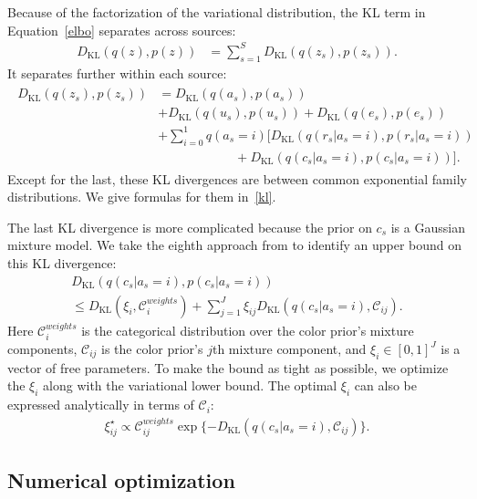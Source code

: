 Because of the factorization of the variational distribution, the KL term in Equation~\ref{elbo} separates across sources:
\begin{align}
D_{\mathrm{KL}}(q(z), p(z)) &= \sum_{s=1}^S D_{\mathrm{KL}}(q(z_s), p(z_s)).\label{eq:kl}
\end{align}
It separates further within each source:
\begin{align}
\begin{split}
D_{\mathrm{KL}}(q(z_s), p(z_s)) &=
D_{\mathrm{KL}}(q(a_s), p(a_s))\\
&+ D_{\mathrm{KL}}(q(u_s), p(u_s))
+ D_{\mathrm{KL}}(q(e_s), p(e_s))\\
&+ \sum_{i=0}^1 q(a_s = i) \Big[
    D_{\mathrm{KL}}(q(r_s | a_s = i), p(r_s | a_s = i))\\
    &\qquad\qquad\qquad + D_{\mathrm{KL}}(q(c_s | a_s = i), p(c_s | a_s = i))
\Big].
\end{split}
\label{kleq}
\end{align}
Except for the last, these KL divergences are between common exponential family distributions. We give formulas for them in~\ref{kl}.

The last KL divergence is more complicated because the prior on $c_s$ is a Gaussian mixture model.
We take the eighth approach from \citet{hershey2007approximating} to identify an upper bound on this KL divergence:
\begin{multline}
D_{\mathrm{KL}}(q(c_s | a_s = i), p(c_s | a_s = i)) \\ \le
D_{\mathrm{KL}}(\xi_i, \mathcal C_{i}^{weights}) + \sum_{j=1}^J \xi_{ij} D_{\mathrm{KL}}(q(c_s | a_s = i), \mathcal C_{ij}).
\end{multline}
Here $\mathcal C_{i}^{weights}$ is the categorical distribution over the color prior's mixture components, $\mathcal C_{ij}$ is the color prior's $j$th mixture component, and $\xi_{i} \in [0,1]^J$ is a vector of free parameters.
To make the bound as tight as possible, we optimize the $\xi_i$ along with the variational lower bound. The optimal $\xi_i$
can also be expressed analytically in terms of $\mathcal C_i$:
\begin{align}
\xi_{ij}^\star \propto \mathcal C_{ij}^{weights} \exp\{-D_{\mathrm{KL}}(q(c_s | a_s = i), \mathcal C_{ij})\}.
\end{align}


\subsection{Numerical optimization}
\label{numerical}

